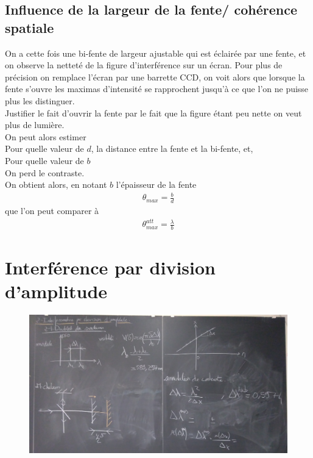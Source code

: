 \documentclass[12pt,prb,aps,epsf]{report}
\begin{document}
\subsection{Influence de la largeur de la fente/ cohérence spatiale}
On a cette fois une bi-fente de largeur ajustable qui est éclairée par une fente, et on observe la netteté de la figure d'interférence sur un écran. Pour plus de précision on remplace l'écran par une barrette CCD, on voit alors que lorsque la fente s'ouvre les maximas d'intensité se rapprochent jusqu'à ce que l'on ne puisse plus les distinguer.\\
Justifier le fait d'ouvrir la fente par le fait que la figure étant peu nette on veut plus de lumière.\\
On peut alors estimer \\

Pour quelle valeur de $d$, la distance entre la fente et la bi-fente, et,\\

Pour quelle valeur de $b$\\
On perd le contraste.\\

On obtient alors, en notant $b$ l'épaisseur de la fente 
\begin{eqnarray}
\theta_{max} = \frac{b}{d}
\end{eqnarray}
que l'on peut comparer à 
\begin{eqnarray}
\theta_{max}^{att} =\frac{\lambda}{b}
\end{eqnarray}

\section{Interférence par division d'amplitude}
\begin{figure}
	\centerline{\includegraphics[width=14cm]{p2}}
\end{figure}
\end{document}
